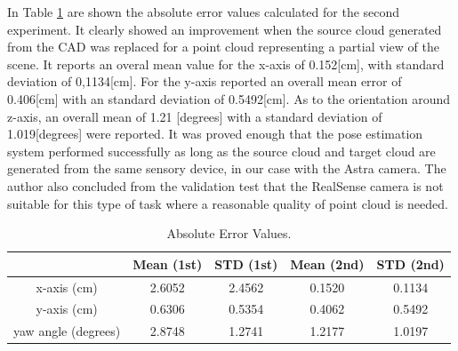 In Table \ref{absolute} are shown the absolute error values calculated for the second experiment. It clearly showed an improvement when the source cloud generated from the CAD was replaced for a point cloud representing a partial view of the scene. It reports an overal mean value for the x-axis of 0.152[cm],  with standard deviation of 0,1134[cm]. For the y-axis reported an overall mean error of 0.406[cm] with an standard deviation of 0.5492[cm]. As to the orientation around z-axis, an overall mean of 1.21 [degrees] with a standard deviation of 1.019[degrees] were reported. It was proved enough that the pose estimation system performed successfully as long as the source cloud and target cloud are generated from the same sensory device, in our case with the Astra camera. The author also concluded from the validation test that the RealSense camera is not suitable for this type of task where a reasonable quality of point cloud is needed.  



\begin{table}[ht]
\renewcommand{\arraystretch}{1.3}
\caption{Absolute Error Values.}
\label{absolute}
\centering
\begin{tabular}{|c||c||c||c||c|}
\hline
  & Mean (1st)& STD (1st) &  Mean (2nd)& STD (2nd) \\
\hline
x-axis (cm) & 2.6052 & 2.4562 & 0.1520 & 0.1134\\
\hline
y-axis (cm) & 0.6306 & 0.5354 & 0.4062 & 0.5492\\
\hline
yaw angle (degrees)& 2.8748 & 1.2741 & 1.2177 & 1.0197\\
\hline
\hline
\end{tabular}
\end{table}


